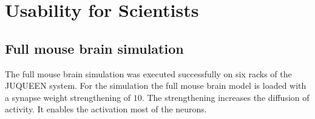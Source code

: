 
\newpage
\section{Usability for Scientists}

\subsection{Full mouse brain simulation}
The full mouse brain simulation was executed successfully on six racks of the JUQUEEN system.
For the simulation the full mouse brain model is loaded with a synapse weight strengthening of $10$.
The strengthening increases the diffusion of activity.
It enables the activation most of the neurons.
